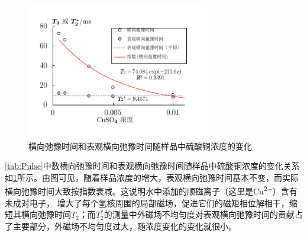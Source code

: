 		
	\FloatBarrier
	\begin{figure}
	    \includegraphics[width=80mm]{./dat/xlsxs/TransverseRelaxationTimeAndApparentTransverseRelaxationTime.pdf}\caption{横向弛豫时间和表观横向弛豫时间随样品中硫酸铜浓度的变化}\label{fig:t2t2starc}
	\end{figure}
	\FloatBarrier
		\cref{tab:Pulse}中数横向弛豫时间和表观横向弛豫时间随样品中硫酸铜浓度的变化关系如\cref{fig:t2t2starc}所示。由图可见，随着样品浓度的增大，表观横向弛豫时间基本不变，而实际横向弛豫时间大致按指数衰减。这说明水中添加的顺磁离子（这里是Cu\textsuperscript{2+}）含有未成对电子，%
		增大了每个氢核周围的局部磁场，促进它们的磁矩相位解相干，缩短其横向弛豫时间$T_2$；而$T_2^*$的测量中外磁场不均匀度对表观横向弛豫时间的贡献占了主要部分，外磁场不均匀度过大，随浓度变化的变化就很小。
